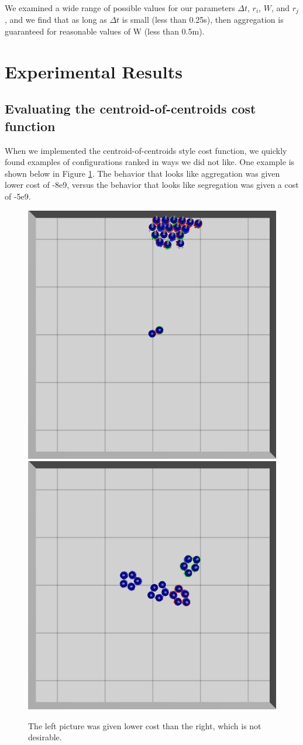 \documentclass[conference]{IEEEtran}
\begin{document}
     We examined a wide range of possible values for our parameters $\Delta t$, $r_i$, $W$, and $r_j$, and we find that as long as $\Delta t$ is small (less than 0.25s), then aggregation is guaranteed for reasonable values of W (less than 0.5m).

\section{Experimental Results}

  \subsection{Evaluating the centroid-of-centroids cost function} \label{section:evaluting_cost_functions}

    When we implemented the centroid-of-centroids style cost function, we quickly found examples of configurations ranked in ways we did not like. One example is shown below in Figure \ref{fig:cost_function_fuckup}. The behavior that looks like aggregation was given lower cost of -8e9, versus the behavior that looks like segregation was given a cost of -5e9.

    \begin{figure}[H]
      \centering
      \includegraphics[width=0.49\linewidth]{./images/individual_0_gen_0.png}
      \includegraphics[width=0.49\linewidth]{./images/individual_0_gen_1_better.png}
      \caption{The left picture was given lower cost than the right, which is not desirable.}
      \label{fig:cost_function_fuckup}
    \end{figure}
\end{document}
